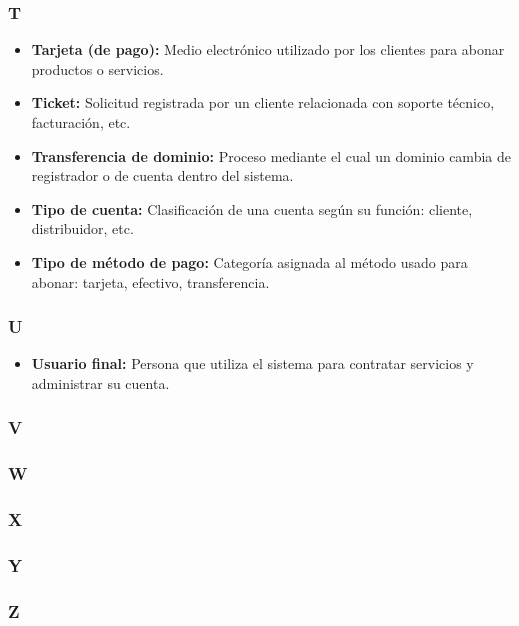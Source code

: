\subsubsection*{T}
\begin{itemize}
\item \textbf{Tarjeta (de pago):} Medio electrónico utilizado por los clientes para abonar productos o servicios.
\item \textbf{Ticket:} Solicitud registrada por un cliente relacionada con soporte técnico, facturación, etc.
\item \textbf{Transferencia de dominio:} Proceso mediante el cual un dominio cambia de registrador o de cuenta dentro del sistema.
\item \textbf{Tipo de cuenta:} Clasificación de una cuenta según su función: cliente, distribuidor, etc.
\item \textbf{Tipo de método de pago:} Categoría asignada al método usado para abonar: tarjeta, efectivo, transferencia.
\end{itemize}

\subsubsection*{U}
\begin{itemize}
\item \textbf{Usuario final:} Persona que utiliza el sistema para contratar servicios y administrar su cuenta.
\end{itemize}

\subsubsection*{V}

\subsubsection*{W}

\subsubsection*{X}

\subsubsection*{Y}

\subsubsection*{Z}
